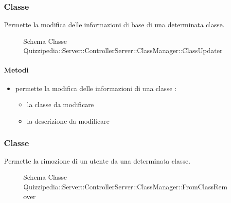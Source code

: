 \subsubsection{Classe }
Permette la modifica delle informazioni di base di una determinata classe.
\begin{figure}[H]
\centering
\noindent{}
\caption[Schema Classe ClassUpdater]{Schema Classe Quizzipedia::Server::ControllerServer::ClassManager::ClassUpdater}
\end{figure}
\paragraph{Metodi}
\begin{itemize}
\item {}
\newline
permette la modifica delle informazioni di una classe
\newline
{} :
\begin{itemize}
\item {}
\newline
la classe da modificare
\item {}
\newline
la descrizione da modificare
\end{itemize}
\end{itemize}
\subsubsection{Classe }
Permette la rimozione di un utente da una determinata classe.
\begin{figure}[H]
\centering
\noindent{}
\caption[Schema Classe FromClassRemover]{Schema Classe Quizzipedia::Server::ControllerServer::ClassManager::FromClassRemover}
\end{figure}
